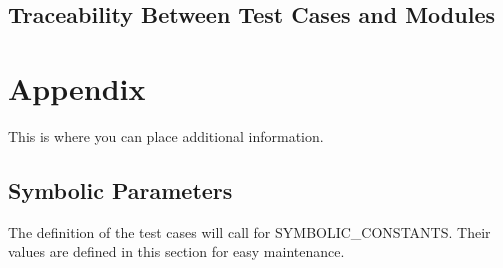 \documentclass[12pt, titlepage]{article}
\begin{document}
\subsection{Traceability Between Test Cases and Modules}


				




\newpage

\section{Appendix}

This is where you can place additional information.

\subsection{Symbolic Parameters}

The definition of the test cases will call for SYMBOLIC\_CONSTANTS.
Their values are defined in this section for easy maintenance.
\end{document}
